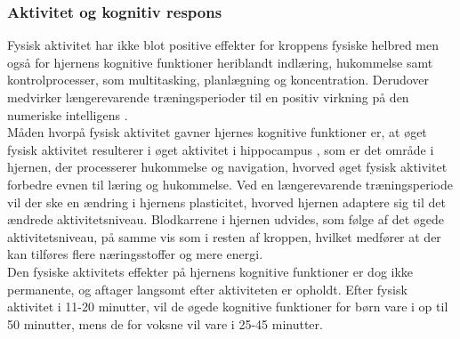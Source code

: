 \subsubsection{Aktivitet og kognitiv respons}
Fysisk aktivitet har ikke blot positive effekter for kroppens fysiske helbred men også for hjernens kognitive funktioner heriblandt indlæring, hukommelse samt kontrolprocesser, som multitasking, planlægning og koncentration. Derudover medvirker længerevarende træningsperioder til en positiv virkning på den numeriske intelligens \citep{Bugge2015,Berchtold2010,Schmidt2015}.\\
Måden hvorpå fysisk aktivitet gavner hjernes kognitive funktioner er, at øget fysisk aktivitet resulterer i øget aktivitet i hippocampus , som er det område i hjernen, der processerer hukommelse og navigation, hvorved øget fysisk aktivitet forbedre evnen til læring og hukommelse. Ved en længerevarende træningsperiode vil der ske en ændring i hjernens plasticitet, hvorved hjernen adaptere sig til det ændrede aktivitetsniveau. Blodkarrene i hjernen udvides, som følge af det øgede aktivitetsniveau, på samme vis som i resten af kroppen, hvilket medfører at der kan tilføres flere næringsstoffer og mere energi. \citep{Cotman2007}\\
Den fysiske aktivitets effekter på hjernens kognitive funktioner er dog ikke permanente, og aftager langsomt efter aktiviteten er opholdt. Efter fysisk aktivitet i 11-20 minutter, vil de øgede kognitive funktioner for børn vare i op til 50 minutter, mens de for voksne vil vare i 25-45 minutter. \citep{Cotman2007}



